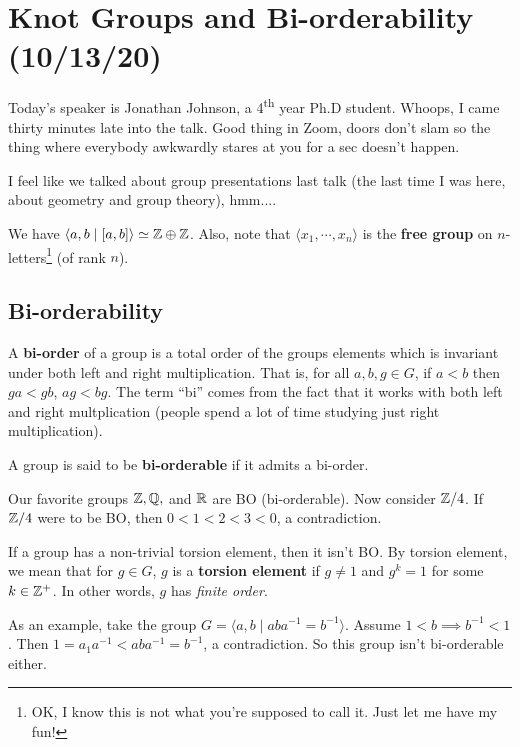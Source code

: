 \section{Knot Groups and Bi-orderability (10/13/20)}
Today's speaker is Jonathan Johnson, a 4\textsuperscript{th} year Ph.D student. Whoops, I came thirty minutes late into the talk. Good thing in Zoom, doors don't slam so the thing where everybody awkwardly stares at you for a sec doesn't happen.

\orbreak
I feel like we talked about group presentations last talk (the last time I was here, about geometry and group theory), hmm....
\begin{example}
    We have $\langle a,b \mid [a,b] \rangle \simeq \mathbb{Z}\oplus \mathbb{Z}$. Also, note that $\langle x_1,\cdots ,x_n  \rangle $ is the \textbf{free group} on $n$-letters\footnote{OK, I know this is not what you're supposed to call it. Just let me have my fun!} (of rank $n$).
\end{example}

\subsection{Bi-orderability}
\begin{definition}[Bi-order]
    A \textbf{bi-order} of a group is a total order of the groups elements which is invariant under both left and right multiplication. That is, for all $a,b,g\in G$, if $a<b$ then $ga<gb$, $ag<bg$. The term ``bi'' comes from the fact that it works with both left and right multplication (people spend a lot of time studying just right multiplication). 

    A group is said to be \textbf{bi-orderable} if it admits a bi-order.
\end{definition}
\begin{example}
    Our favorite groups $\mathbb{Z},\mathbb{Q},$ and $\mathbb{R}$ are BO (bi-orderable). Now consider $\mathbb{Z} /4$. If $\mathbb{Z} /4$ were to be BO, then $0<1<2<3<0$, a contradiction.
\end{example}
\begin{prop}
    If a group has a non-trivial torsion element, then it isn't BO. By torsion element, we mean that for $g\in G$, $g$ is a \textbf{torsion element} if $g\neq 1$ and $g^{k}=1$ for some $k\in \mathbb{Z}^{+}$. In other words, $g$ has \emph{finite order}.
\end{prop}
As an example, take the group $G=\langle a,b \mid aba^{-1}=b^{-1} \rangle $. Assume $1<b\implies b^{-1}<1$. Then $1=a_1a^{-1}<aba^{-1}=b^{-1}$, a contradiction. So this group isn't bi-orderable either.
